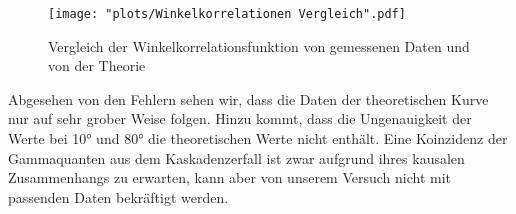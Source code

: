 \documentclass[%
aps,
onecolumn,
11pt,
tightenlines,
nofootinbib,
superscriptaddress,
floatfix,
prd,
]{revtex4-2}
\begin{document}
\begin{figure}[H]
	\centering
	\texttt{[image: "plots/Winkelkorrelationen Vergleich".pdf]}
	\caption{Vergleich der Winkelkorrelationsfunktion von gemessenen Daten und von der Theorie}
	\label{fig:coincidencecobalt}
\end{figure}

Abgesehen von den Fehlern sehen wir, dass die Daten der theoretischen Kurve nur auf sehr grober Weise folgen. Hinzu kommt, dass die Ungenauigkeit der Werte bei 10° und 80° die theoretischen Werte nicht enthält. Eine Koinzidenz der Gammaquanten aus dem Kaskadenzerfall ist zwar aufgrund ihres kausalen Zusammenhangs zu erwarten, kann aber von unserem Versuch nicht mit passenden Daten bekräftigt werden. 

\end{document}

